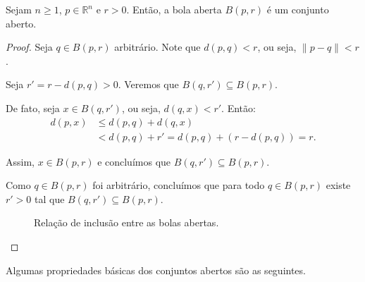 \begin{proposition}
    Sejam $n\geq 1$, $p \in \mathbb R^n$ e $r>0$.
    Então, a bola aberta $B(p, r)$ é um conjunto aberto.
\end{proposition}
\begin{proof}
    Seja $q \in B(p, r)$ arbitrário.
    Note que $d(p, q) < r$, ou seja, $\|p-q\| < r$.

    Seja $r' = r - d(p, q) > 0$.
    Veremos que $B(q, r') \subseteq B(p, r)$.

    De fato, seja $x \in B(q, r')$, ou seja, $d(q, x) < r'$.
    Então:
    \begin{align*}
        d(p, x) &\leq d(p, q) + d(q, x) \\
        &< d(p, q) + r' = d(p, q) + (r - d(p, q)) = r.
    \end{align*}

    Assim, $x \in B(p, r)$ e concluímos que $B(q, r') \subseteq B(p, r)$.

    Como $q \in B(p, r)$ foi arbitrário, concluímos que para todo $q \in B(p, r)$ existe $r'>0$ tal que $B(q, r')\subseteq B(p, r)$.

    \begin{figure}[H]
    \centering
    \caption{Relação de inclusão entre as bolas abertas.}
    \end{figure}
\end{proof}

Algumas propriedades básicas dos conjuntos abertos são as seguintes.

